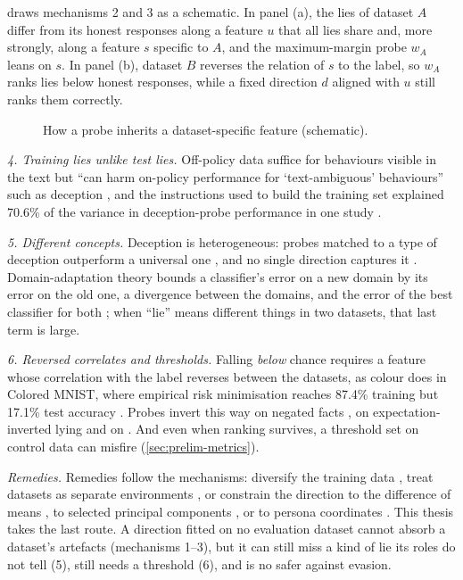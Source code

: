  draws mechanisms 2 and 3 as a schematic. In panel (a), the lies of dataset $A$
differ from its honest responses along a feature $u$ that all lies share and, more strongly, along a
feature $s$ specific to $A$, and the maximum-margin probe $w_A$ leans on $s$. In panel (b), dataset $B$
reverses the relation of $s$ to the label, so $w_A$ ranks lies below honest responses, while a fixed
direction $d$ aligned with $u$ still ranks them correctly.

\begin{figure}[t]
\centering

\caption{How a probe inherits a dataset-specific feature (schematic).}
\label{fig:spurious}
\end{figure}

\emph{4. Training lies unlike test lies.} Off-policy data suffice for behaviours visible in the text
but ``can harm on-policy performance for `text-ambiguous' behaviours'' such as deception
\cite{kirch2025offpolicy}, and the instructions used to build the training set explained 70.6\% of the
variance in deception-probe performance in one study \cite{natarajan2026targeted}.

\emph{5. Different concepts.} Deception is heterogeneous: probes matched to a type of deception
outperform a universal one \cite{natarajan2026targeted}, and no single direction captures it
\cite{kumar2026pressure}. Domain-adaptation theory bounds a classifier's error on a new domain by its
error on the old one, a divergence between the domains, and the error of the best classifier for both
\cite{bendavid2010theory}; when ``lie'' means different things in two datasets, that last term is large.

\emph{6. Reversed correlates and thresholds.} Falling \emph{below} chance requires a feature whose
correlation with the label reverses between the datasets, as colour does in Colored MNIST, where
empirical risk minimisation reaches 87.4\% training but 17.1\% test accuracy
\cite{arjovsky2019invariant}. Probes invert this way on negated
facts \cite{levinstein2025still}, on expectation-inverted lying \cite{ying2026truthfulness} and on \hpkr{}
\cite{kretschmar2025liars,moustafa2026beyond}. And even when ranking survives, a threshold set on
control data can misfire (\cref{sec:prelim-metrics}).

\emph{Remedies.} Remedies follow the mechanisms: diversify the training data
\cite{liu2024universal,ying2026truthfulness}, treat datasets as separate environments
\cite{arjovsky2019invariant}, or constrain the direction to the difference of means
\cite{marks2023geometry,mallen2024eliciting}, to selected principal components \cite{yoo2026subspace},
or to persona coordinates \cite{mahadik2026persona}. This thesis takes the last route. A direction fitted on
no evaluation dataset cannot absorb a dataset's artefacts (mechanisms 1--3), but it can still miss a kind
of lie its roles do not tell (5), still needs a threshold (6), and is no safer against evasion.

